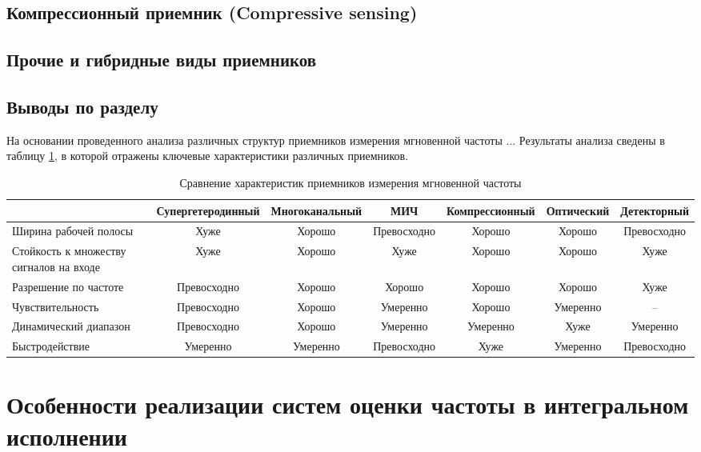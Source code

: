 \subsection{Компрессионный приемник (Compressive sensing)}

\subsection{Прочие и гибридные виды приемников}

\subsection{Выводы по разделу}

На основании проведенного анализа различных структур приемников измерения мгновенной частоты ...
Результаты анализа сведены в таблицу \ref{t:survey}, в которой отражены ключевые характеристики различных приемников.

\begin{table}
\caption{Сравнение характеристик приемников измерения мгновенной частоты\label{t:survey}}
	\begin{adjustbox}{width=\columnwidth,center}
		
		\begin{tabular}{@{}m{8em}cccccc@{}}
			\toprule
													&	Супергетеродинный	& Многоканальный & МИЧ & Компрессионный & Оптический & Детекторный\\
			\midrule
			Ширина рабочей полосы					&	Хуже 				& Хорошо	& Превосходно	& Хорошо & Хорошо & Превосходно\\
			Стойкость к множеству сигналов на входе &	Хуже 				& Хорошо	& Хуже	& Хорошо & Хорошо & Хуже\\
			Разрешение по частоте 					& 	Превосходно 		& Хорошо	& Хорошо	& Хорошо & Хорошо & Хуже\\
			Чувствительность 						& 	Превосходно 		& Хорошо	& Умеренно	& Хорошо & Умеренно & --\\
			Динамический диапазон 					& 	Превосходно 		& Хорошо	& Умеренно	& Умеренно & Хуже & Умеренно\\
			Быстродействие							&	Умеренно			& Умеренно	& Превосходно & Хуже	& Умеренно & Превосходно \\
			\bottomrule
		\end{tabular}
	\end{adjustbox}
\end{table}

\section{Особенности реализации систем оценки частоты в интегральном исполнении}

